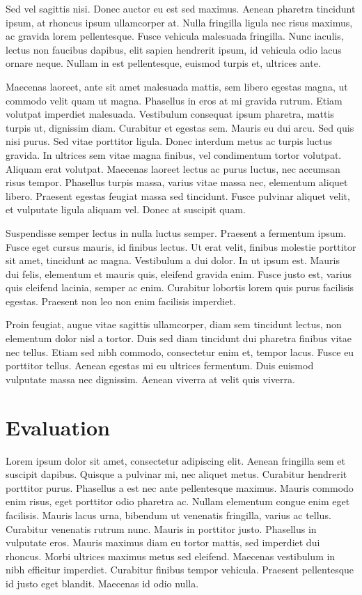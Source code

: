 \documentclass[12pt, letterpaper]{article}
\begin{document}
Sed vel sagittis nisi. Donec auctor eu est sed maximus. Aenean pharetra tincidunt ipsum, at rhoncus ipsum ullamcorper at. Nulla fringilla ligula nec risus maximus, ac gravida lorem pellentesque. Fusce vehicula malesuada fringilla. Nunc iaculis, lectus non faucibus dapibus, elit sapien hendrerit ipsum, id vehicula odio lacus ornare neque. Nullam in est pellentesque, euismod turpis et, ultrices ante.

Maecenas laoreet, ante sit amet malesuada mattis, sem libero egestas magna, ut commodo velit quam ut magna. Phasellus in eros at mi gravida rutrum. Etiam volutpat imperdiet malesuada. Vestibulum consequat ipsum pharetra, mattis turpis ut, dignissim diam. Curabitur et egestas sem. Mauris eu dui arcu. Sed quis nisi purus. Sed vitae porttitor ligula. Donec interdum metus ac turpis luctus gravida. In ultrices sem vitae magna finibus, vel condimentum tortor volutpat. Aliquam erat volutpat. Maecenas laoreet lectus ac purus luctus, nec accumsan risus tempor. Phasellus turpis massa, varius vitae massa nec, elementum aliquet libero. Praesent egestas feugiat massa sed tincidunt. Fusce pulvinar aliquet velit, et vulputate ligula aliquam vel. Donec at suscipit quam.

Suspendisse semper lectus in nulla luctus semper. Praesent a fermentum ipsum. Fusce eget cursus mauris, id finibus lectus. Ut erat velit, finibus molestie porttitor sit amet, tincidunt ac magna. Vestibulum a dui dolor. In ut ipsum est. Mauris dui felis, elementum et mauris quis, eleifend gravida enim. Fusce justo est, varius quis eleifend lacinia, semper ac enim. Curabitur lobortis lorem quis purus facilisis egestas. Praesent non leo non enim facilisis imperdiet.

Proin feugiat, augue vitae sagittis ullamcorper, diam sem tincidunt lectus, non elementum dolor nisl a tortor. Duis sed diam tincidunt dui pharetra finibus vitae nec tellus. Etiam sed nibh commodo, consectetur enim et, tempor lacus. Fusce eu porttitor tellus. Aenean egestas mi eu ultrices fermentum. Duis euismod vulputate massa nec dignissim. Aenean viverra at velit quis viverra.

\section{Evaluation}
Lorem ipsum dolor sit amet, consectetur adipiscing elit. Aenean fringilla sem et suscipit dapibus. Quisque a pulvinar mi, nec aliquet metus. Curabitur hendrerit porttitor purus. Phasellus a est nec ante pellentesque maximus. Mauris commodo enim risus, eget porttitor odio pharetra ac. Nullam elementum congue enim eget facilisis. Mauris lacus urna, bibendum ut venenatis fringilla, varius ac tellus. Curabitur venenatis rutrum nunc. Mauris in porttitor justo. Phasellus in vulputate eros. Mauris maximus diam eu tortor mattis, sed imperdiet dui rhoncus. Morbi ultrices maximus metus sed eleifend. Maecenas vestibulum in nibh efficitur imperdiet. Curabitur finibus tempor vehicula. Praesent pellentesque id justo eget blandit. Maecenas id odio nulla.
\end{document}
